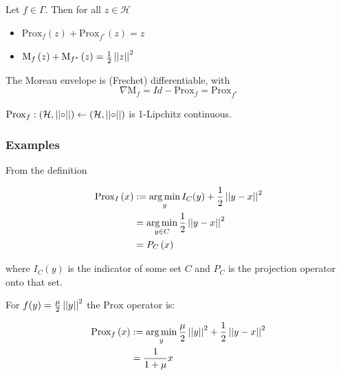 \begin{theorem}
Let \(f \in \Gamma\). Then for all \(z \in \mathcal{H}\)
\begin{itemize}
\item \( \mathrm{Prox}_f\left(z\right) + \mathrm{Prox}_{f^*}\left(z\right) = z   \)
\item \( \mathrm{M}_f\left(z\right)  + \mathrm{M}_{f^*}\left(z\right)  = \frac{1}{2}\left|\left|z\right|\right|^2 \)
\end{itemize}
\end{theorem}

\begin{theorem}
The Moreau envelope is (Frechet) differentiable, with 
\begin{equation}
\nabla \mathrm{M}_f = Id - \mathrm{Prox}_{f} = \mathrm{Prox}_{f^*}
\end{equation}
\end{theorem}

\begin{theorem}
\( \mathrm{Prox}_f : \left(\mathcal{H}, \left|\left|\circ\right|\right|\right) \leftarrow \left(\mathcal{H}, \left|\left|\circ\right|\right|\right) \) is 1-Lipchitz continuous.
\end{theorem}


\subsubsection{Examples}

\begin{example}[Indicator]
From the definition 

\begin{align}
\mathrm{Prox}_I\left(x\right) &:=  \operatorname*{arg\,min}_y I_C(y) + \frac{1}{2}\left|\left|y-x\right|\right|^2 \\
& = \operatorname*{arg\,min}_{y \in C} \frac{1}{2}\left|\left|y-x\right|\right|^2 \\
& = P_C\left(x\right)
\end{align}

where \(I_C(y)\) is the indicator of some set \(C\) and \(P_C\) is the projection operator onto that set.
\end{example} 

\begin{example}[\(l_2\) norm]
For \(f(y) = \frac{\mu}{2}\left|\left|y\right|\right|^2\) the \(\mathrm{Prox}\) operator is:

\begin{align}
\mathrm{Prox}_f\left(x\right) &:=  \operatorname*{arg\,min}_y \frac{\mu}{2}\left|\left|y\right|\right|^2 + \frac{1}{2}\left|\left|y-x\right|\right|^2 \\
& = \frac{1}{1+\mu}x
\end{align}
\end{example}


